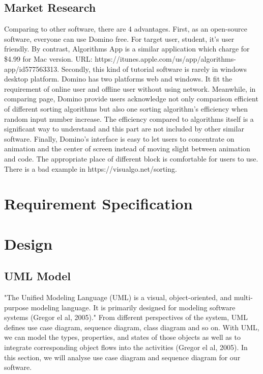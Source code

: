 \documentclass[paper=a4, fontsize=11pt,twoside]{scrartcl}		%
\begin{document}
\subsection{Market Research}
Comparing to other software, there are 4 advantages. First, as an open-source software, everyone can use Domino free. For target user, student, it’s user friendly. By contrast, Algorithms App is a similar application which charge for \$4.99 for Mac version. URL: https://itunes.apple.com/us/app/algorithms-app/id577563313. Secondly, this kind of tutorial software is rarely in windows desktop platform. Domino has two platforms web and windows. It fit the requirement of online user and offline user without using network. Meanwhile, in comparing page, Domino provide users acknowledge not only comparison efficient of different sorting algorithms but also one sorting algorithm’s efficiency when random input number increase. The efficiency compared to algorithms itself is a significant way to understand and this part are not included by other similar software. Finally, Domino’s interface is easy to let users to concentrate on animation and the center of screen instead of moving slight between animation and code. The appropriate place of different block is comfortable for users to use. There is a bad example in https://visualgo.net/sorting.

\section{Requirement Specification}
\clearpage

\section{Design}
\subsection{UML Model}
"The Unified Modeling Language (UML) is a visual, object-oriented, and multi-purpose modeling language. It is primarily designed for modeling software systems (Gregor el al, 2005)." From different perspectives of the system, UML defines use case diagram, sequence diagram, class diagram and so on. With UML, we can model the types, properties, and states of those objects as well as to integrate corresponding object flows into the activities (Gregor el al, 2005). In this section, we will analyse use case diagram and sequence diagram for our software.
\end{document}
